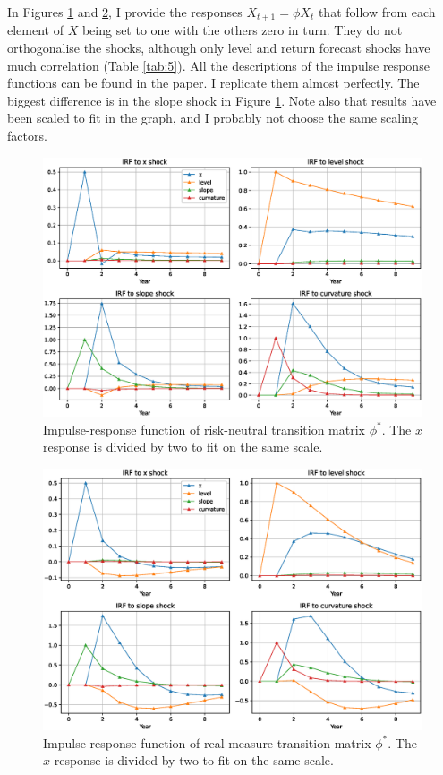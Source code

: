 In Figures \ref{fig:7} and \ref{fig:8}, I provide the responses $X_{t+1} = \phi X_t$ that follow from each element of $X$ being set to one with the others zero in turn. They do not orthogonalise the shocks, although only level and return forecast shocks have much correlation (Table \ref{tab:5}). All the descriptions of the impulse response functions can be found in the paper. I replicate them almost perfectly. The biggest difference is in the slope shock in Figure \ref{fig:7}. Note also that results have been scaled to fit in the graph, and I probably not choose the same scaling factors.



\begin{figure}[h!]
	\centering
	\caption{Impulse-response function of risk-neutral transition matrix $\phi^\ast$. The $x$ response is divided by two to fit on the same scale.}\label{fig:7}
	\includegraphics[scale=0.5]{fig/eps/Figure7.eps}
\end{figure}

\begin{figure}[h!]
	\centering
	\caption{Impulse-response function of real-measure transition matrix $\phi^\ast$. The $x$ response is divided by two to fit on the same scale.} \label{fig:8}
	\includegraphics[scale=0.5]{fig/eps/Figure8.eps}
\end{figure}

